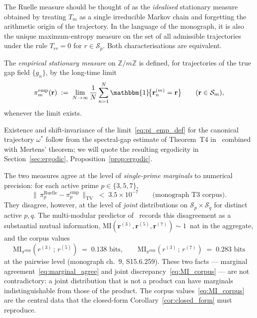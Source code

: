 The Ruelle measure should be thought of as the \emph{idealised}
stationary measure obtained by treating $T_m$ as a single irreducible
Markov chain and forgetting the arithmetic origin of the trajectory.
In the language of the monograph, it is also the unique
maximum-entropy measure on the set of all admissible trajectories
under the rule $T_{rr} = 0$ for $r \in \mathcal{S}_p$. Both
characterisations are equivalent.

\begin{definition}
\label{def:pi_emp}
The \emph{empirical stationary measure} on $\mathbb{Z}/m\mathbb{Z}$ is
defined, for trajectories of the true gap field $\{g_n\}$, by the
long-time limit
\begin{equation}
  \pi_m^{\mathrm{emp}}(\mathbf{r})
  \;:=\;
  \lim_{N \to \infty}
  \frac{1}{N} \sum_{n=1}^{N}
  \mathbbm{1}\!\bigl\{\mathbf{r}_n^{(m)} = \mathbf{r}\bigr\}
  \qquad (\mathbf{r} \in \mathcal{S}_m),
  \label{eq:pi_emp_def}
\end{equation}
whenever the limit exists.
\end{definition}

\noindent
Existence and shift-invariance of the limit~\eqref{eq:pi_emp_def} for
the canonical trajectory $\omega^\ast$ follow from the spectral-gap
estimate of Theorem~T4 in~\cite{PT_Monograph} combined with
Mertens' theorem; we will quote the resulting ergodicity in
Section~\ref{sec:ergodic}, Proposition~\ref{prop:ergodic}.

\begin{remark}
\label{rmk:marginal_vs_joint}
The two measures agree at the level of \emph{single-prime marginals}
to numerical precision: for each active prime $p \in \{3, 5, 7\}$,
\begin{equation}
  \bigl\|\, \pi_p^{\mathrm{Ruelle}} - \pi_p^{\mathrm{emp}}\,\bigr\|_{\mathrm{TV}}
  \;<\; 3.5 \times 10^{-7}
  \qquad
  \text{(monograph T3 corpus)}.
  \label{eq:marginal_agree}
\end{equation}
They disagree, however, at the level of \emph{joint} distributions on
$\mathcal{S}_p \times \mathcal{S}_q$ for distinct active $p, q$. The
multi-modular predictor of~\cite[Ch.~math\_structures]{PT_Monograph}
records this disagreement as a substantial mutual information,
$\mathrm{MI}(\mathbf{r}^{(3)}, \mathbf{r}^{(5)}, \mathbf{r}^{(7)})
\sim 1$~nat in the aggregate, and the corpus values
\begin{equation}
  \mathrm{MI}_{\pi^{\mathrm{emp}}}(r^{(3)}\, ; \, r^{(5)}) \;=\; 0.138 \text{ bits},
  \qquad
  \mathrm{MI}_{\pi^{\mathrm{emp}}}(r^{(3)}\, ; \, r^{(7)}) \;=\; 0.283 \text{ bits}
  \label{eq:MI_corpus}
\end{equation}
at the pairwise level (monograph ch.~9, S15.6.259). These two facts ---
marginal agreement~\eqref{eq:marginal_agree} and joint
discrepancy~\eqref{eq:MI_corpus} --- are not contradictory: a joint
distribution that is not a product can have marginals indistinguishable
from those of the product. The corpus values~\eqref{eq:MI_corpus} are
the central data that the closed-form Corollary~\ref{cor:closed_form}
must reproduce.
\end{remark}

